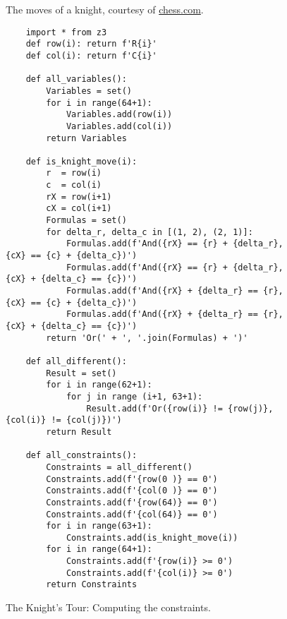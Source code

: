 \begin{figure}[!ht]
  \centering
  \caption{The moves of a knight, courtesy of \href{https://www.chess.com/}{chess.com}.}
  \label{fig:knight-moves.png}
\end{figure}

\begin{figure}[!ht]
\centering
\begin{verbatim}
    import * from z3
    def row(i): return f'R{i}'
    def col(i): return f'C{i}'
    
    def all_variables():
        Variables = set()
        for i in range(64+1):
            Variables.add(row(i))
            Variables.add(col(i))
        return Variables
    
    def is_knight_move(i):
        r  = row(i)
        c  = col(i)
        rX = row(i+1)
        cX = col(i+1)
        Formulas = set()
        for delta_r, delta_c in [(1, 2), (2, 1)]:
            Formulas.add(f'And({rX} == {r} + {delta_r}, {cX} == {c} + {delta_c})')
            Formulas.add(f'And({rX} == {r} + {delta_r}, {cX} + {delta_c} == {c})')
            Formulas.add(f'And({rX} + {delta_r} == {r}, {cX} == {c} + {delta_c})')
            Formulas.add(f'And({rX} + {delta_r} == {r}, {cX} + {delta_c} == {c})') 
        return 'Or(' + ', '.join(Formulas) + ')'
    
    def all_different():
        Result = set()
        for i in range(62+1):
            for j in range (i+1, 63+1):
                Result.add(f'Or({row(i)} != {row(j)}, {col(i)} != {col(j)})')
        return Result    

    def all_constraints():
        Constraints = all_different()
        Constraints.add(f'{row(0 )} == 0')
        Constraints.add(f'{col(0 )} == 0')
        Constraints.add(f'{row(64)} == 0')
        Constraints.add(f'{col(64)} == 0')
        for i in range(63+1):
            Constraints.add(is_knight_move(i))
        for i in range(64+1):
            Constraints.add(f'{row(i)} >= 0')
            Constraints.add(f'{col(i)} >= 0')
        return Constraints
\end{verbatim}
\vspace*{-0.3cm}
\caption{The Knight's Tour: Computing the constraints.}
\label{fig:Knight's Tour with Z3.ipynb-1}
\end{figure}



